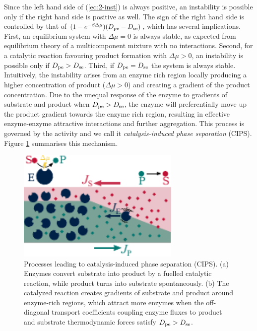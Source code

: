 Since the left hand side of (\ref{eq:2-inst}) is always positive, an instability is possible only if the right hand side is positive as well. The sign of the right hand side is controlled by that of $(1-e^{-\beta\Delta \mu})(D_{\mathrm{pe}}-D_{\mathrm{se}})$, which has several implications. First, an equilibrium system with $\Delta\mu=0$ is always stable, as expected from equilibrium theory of a multicomponent mixture with no interactions. Second, for a catalytic reaction favouring product formation with $\Delta \mu>0$, an instability is possible only if $D_{\mathrm{pe}}>D_{\mathrm{se}}$. Third, if $D_{\mathrm{pe}}=D_{\mathrm{se}}$ the system is always stable. Intuitively, the instability arises from an enzyme rich region locally producing a higher concentration of product ($\Delta \mu > 0$) and creating a gradient of the product concentration. Due to the unequal response of the enzyme to gradients of substrate and product when $D_{\mathrm{pe}}>D_{\mathrm{se}}$, the enzyme will preferentially move up the product gradient towards the enzyme rich region, resulting in effective enzyme-enzyme attractive interactions and further aggregation. This process is governed by the activity and we call it \textit{catalysis-induced phase separation} (CIPS). Figure \ref{fig:cips_scheme} summarises this mechanism.

\begin{figure}
    \centering
    \includegraphics[width=0.7\textwidth]{figures/2-cips-figs/cips_scheme.pdf}
    \caption{Processes leading to catalysis-induced phase separation (CIPS). 
		(a) Enzymes convert substrate into product by a fuelled catalytic reaction, while product turns into substrate spontaneously. (b) The catalyzed reaction creates gradients of substrate and product around enzyme-rich regions, which attract more enzymes when the off-diagonal transport coefficients coupling enzyme fluxes to product and substrate thermodynamic forces satisfy $D_{\mathrm{pe}}>D_{\mathrm{se}}$.}
    \label{fig:cips_scheme}
\end{figure}

